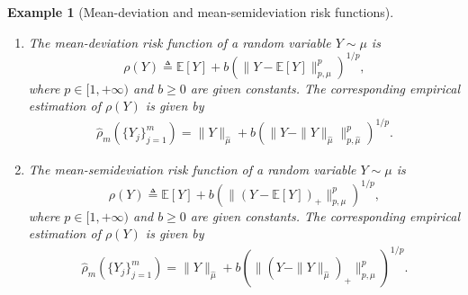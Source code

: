 \documentclass[12pt,technote,onecolumn]{IEEEtran}
\newtheorem{example}{Example}
\begin{document}
\begin{example}[Mean-deviation and mean-semideviation risk functions] 
	\begin{enumerate}
	\item The mean-deviation risk function \cite[Example 4.1]{Ruszczynski:2006uq} of a random variable $Y\sim\mu$ is 	
	\[
	\rho\left(Y\right)\triangleq\mathbb{E}\left[Y\right]+b(\|Y-\mathbb{E}\left[Y\right]\|_{p,\mu}^{p})^{1/p},
	\]
	where $p\in[1,+\infty)$ and $b\geq0$ are given constants. The corresponding empirical estimation of $\rho(Y)$ is given by 	
	\begin{equation*}
	\begin{aligned}
	\hat{\rho}_{m}\left(\{Y_j\}^m_{j=1}\right)
	=\|Y\|_{\hat{\mu}}	+b(\|Y-\|Y\|_{\hat{\mu}}\|_{p,\hat{\mu}}^{p})^{1/p}.		
	\end{aligned}
	\end{equation*}
	\item The mean-semideviation risk function \cite[Example 4.2]{Ruszczynski:2006uq} of a random variable $Y\sim\mu$ is 		
	\[
	\rho\left(Y\right)\triangleq\mathbb{E}\left[Y\right]+b(\|\left(Y-\mathbb{E}\left[Y\right]\right)_{+}\|_{p,\mu}^{p})^{1/p},
	\]
	where $p\in[1,+\infty)$ and $b\geq0$ are given constants. The corresponding empirical estimation of $\rho(Y)$ is given by 	
	\begin{equation*}
	\begin{aligned}	
	\hat{\rho}_{m}\left(\{Y_j\}^m_{j=1}\right)
	=\|Y\|_{\hat{\mu}}
	+b(\|(Y
	-\|Y\|_{\hat{\mu}})_{+}\|_{p,\hat{\mu}}^{p})^{1/p}.
	\end{aligned}
	\end{equation*}	
	\end{enumerate}
\end{example}	
\end{document}
